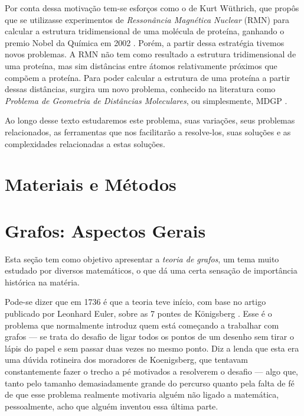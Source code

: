 \documentclass[a4paper,12pt]{article}
\begin{document}
	Por conta dessa motivação tem-se esforços como o de Kurt Wüthrich, que propôs que se utilizasse experimentos de \textit{Ressonância Magnética Nuclear}
	(RMN) para calcular a estrutura tridimensional de uma molécula de proteína, ganhando o premio Nobel da Química em 2002 \cite{RMNproteinWrutrich}. Porém, a partir dessa estratégia tivemos novos problemas. A RMN não tem como resultado a estrutura tridimensional de uma proteína, mas sim distâncias entre átomos relativamente próximos que compõem a proteína. Para poder calcular a estrutura de uma proteína a partir dessas distâncias, surgira um novo problema, conhecido na literatura como \textit{Problema de Geometria de Distâncias Moleculares}, ou simplesmente, MDGP \cite{carlileGDandAplications}.
	
	Ao longo desse texto estudaremos este problema, suas variações, seus problemas relacionados, as ferramentas que nos facilitarão a resolve-los, suas soluções e as complexidades relacionadas a estas soluções.
	
	\newpage

	\section{Materiais e Métodos}
	
	\newpage
	
	\section{Grafos: Aspectos Gerais}
	Esta seção tem como objetivo apresentar a \textit{teoria de grafos}, um tema muito estudado por diversos matemáticos, o que dá uma certa sensação de importância histórica na matéria.
	
	 Pode-se dizer que em 1736 é que a teoria teve início, com base no artigo publicado por Leonhard Euler, sobre as 7 pontes de Königsberg \cite{euler:KOENIGSBERG} \cite{grafos1}. Esse é o problema que normalmente introduz quem está começando a trabalhar com grafos --- se trata do desafio de ligar todos os pontos de um desenho sem tirar o lápis do papel e sem passar duas vezes no mesmo ponto. Diz a lenda que esta era uma dúvida rotineira dos moradores de Koenigsberg, que tentavam constantemente fazer o trecho a pé motivados a resolverem o desafio --- algo que, tanto pelo tamanho demasiadamente grande do percurso quanto pela falta de fé de que esse problema realmente motivaria alguém não ligado a matemática, pessoalmente, acho que alguém inventou essa última parte. 
	
\end{document}

